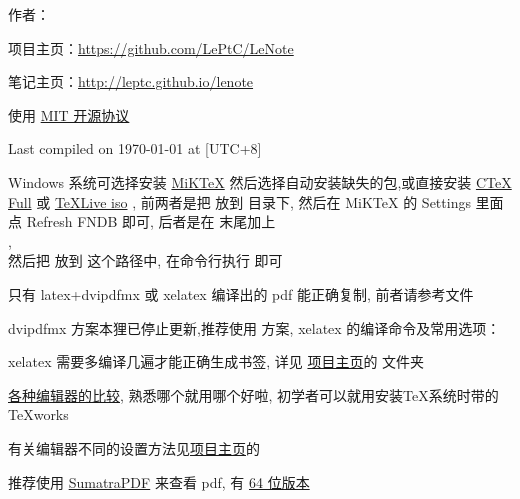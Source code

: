 \documentclass{leptc}
\begin{document}

作者：\href{mailto:alileptc@gmail.com}{\LePtC}

项目主页：\url{https://github.com/LePtC/LeNote }

笔记主页：\url{http://leptc.github.io/lenote }

使用 \href{http://opensource.org/licenses/MIT}{MIT 开源协议}

Last compiled on {\yyyymmdddate\today} at {\hhmmsstime} [UTC+8]



Windows 系统可选择安装
\href{http://miktex.org/download}{MiKTeX}
然后选择自动安装缺失的包,或直接安装
\href{http://www.ctex.org/CTeXDownload }{CTeX Full}
或 \href{http://www.ctan.org/tex-archive/systems/texlive/Images/ }{TeXLive iso} ,
前两者是把  放到
 目录下,
然后在 MiKTeX 的 Settings 里面点 Refresh FNDB 即可,
后者是在  末尾加上
\\ ,
\\然后把 放到
 这个路径中,
在命令行执行  即可

只有 latex+dvipdfmx 或 xelatex 编译出的 pdf 能正确复制,
前者请参考文件 

dvipdfmx 方案本狸已停止更新,推荐使用 \XeTeX 方案,
xelatex 的编译命令及常用选项：


xelatex 需要多编译几遍才能正确生成书签,
详见 \href{https://github.com/LePtC/LeNote}{项目主页}的
 文件夹


\href{http://tex.stackexchange.com/questions/339/latex-editors-ides }{各种编辑器的比较},
熟悉哪个就用哪个好啦,
初学者可以就用安装\TeX 系统时带的 TeXworks

有关编辑器不同的设置方法见\href{https://github.com/LePtC/LeNote}{项目主页}的 

 推荐使用
\href{http://blog.kowalczyk.info/software/sumatrapdf/download-free-pdf-viewer-cn.html }{SumatraPDF}
来查看 pdf, 有
\href{http://xhmikosr.1f0.de/sumatrapdf/ }{64 位版本}
\end{document}
